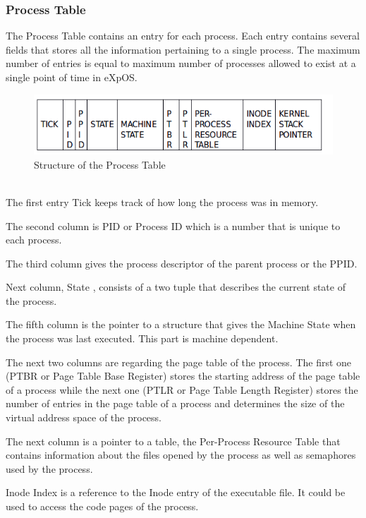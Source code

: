 \documentclass[11pt ,twosided]{article}
\begin{document}
\subsubsection{Process Table}

The Process Table contains an entry for each process.  Each entry contains several fields that stores all the information pertaining to a single process. The maximum number of entries is equal to maximum number of processes allowed to exist at a single point of time in eXpOS.
\begin{figure}[ht]
\centering
\includegraphics[scale=0.60]{Process_table.png}
\caption{\footnotesize Structure of the Process Table}
\label{fig_2}
\end{figure}
\\

The first entry Tick keeps track of how long the process was in memory.

The second column is PID or Process ID which is a number that is unique to each process.

The third column gives the process descriptor of the parent process or the PPID.

Next column, State , consists of a two tuple that describes the current state of the process.

The fifth column is the pointer to a structure that gives the Machine State when the process was last executed.  This part is machine dependent. 

The next two columns are regarding the page table of the process. The first one (PTBR or Page Table Base Register) stores the starting address of the page table of a process while the next one (PTLR or Page Table Length Register) stores the number of entries in the page table of a process and determines the size of the virtual address space of the process.

The next column is a pointer to a table, the Per-Process Resource Table that contains information about the files opened by the process as well as semaphores used by the process.

Inode Index is a reference to the Inode entry of the executable file. It could be used to access the code pages of the process.
\end{document}
